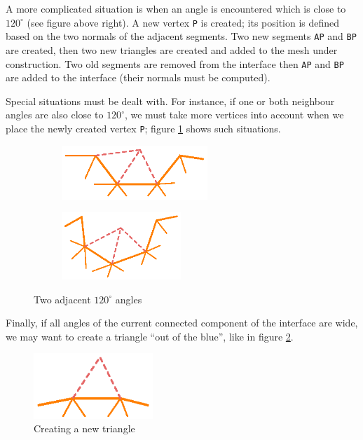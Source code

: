 A more complicated situation is when an angle is encountered which is close to $ 120^\circ $
(see figure above right).
A new vertex {\small\tt P} is created; its position is defined based on the two normals
of the adjacent segments.
Two new segments {\small\tt AP} and {\small\tt BP} are created,
then two new triangles are created and added to the mesh under construction.
Two old segments are removed from the interface then {\small\tt AP} and {\small\tt BP} are added
to the interface (their normals must be computed).

Special situations must be dealt with.
For instance, if one or both neighbour angles are also close to $ 120^\circ $,
we must take more vertices into account when we place the newly created vertex {\small\tt P};
figure \ref{\numb section 12.\numb fig 4} shows such situations.

\begin{figure}[ht] \centering
\begin{subfigure}{60mm}\centering
  \includegraphics[width=55mm]{fill-angle-120-a}
\end{subfigure}  
\begin{subfigure}{50mm}\centering
  \includegraphics[width=45mm]{fill-angle-120-b}
\end{subfigure}  
  \caption{Two adjacent $ 120^\circ $ angles}
  \label{\numb section 12.\numb fig 4}
\end{figure}

Finally, if all angles of the current connected component of the interface are wide,
we may want to create a triangle ``out of the blue'', like in figure
\ref{\numb section 12.\numb fig 5}.

\begin{figure}[ht] \centering
  \includegraphics[width=45mm]{fill-blue}
  \caption{Creating a new triangle}
  \label{\numb section 12.\numb fig 5}
\end{figure}

